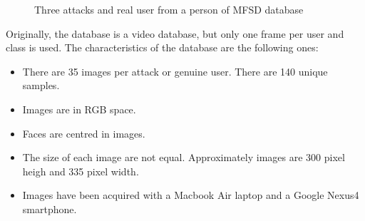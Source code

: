 \begin{figure}[htb]
\centering
{}

\caption{Three attacks and  real user from a person of MFSD database } \label{fig:mfsd}
\end{figure}

Originally, the database is a video database, but only one frame per user and class is used. The characteristics of the database are the following ones:
\begin{itemize}[itemsep=2pt,topsep=8pt,parsep=0pt,partopsep=20pt]
\item There are 35 images per attack or genuine user. There are 140 unique samples.
\item Images are in RGB space.
\item Faces are centred in images.
\item The size of each image are not equal. Approximately images are 300 pixel heigh and 335 pixel width.
\item Images have been acquired with a Macbook Air laptop and a Google Nexus4 smartphone.
\end{itemize}

